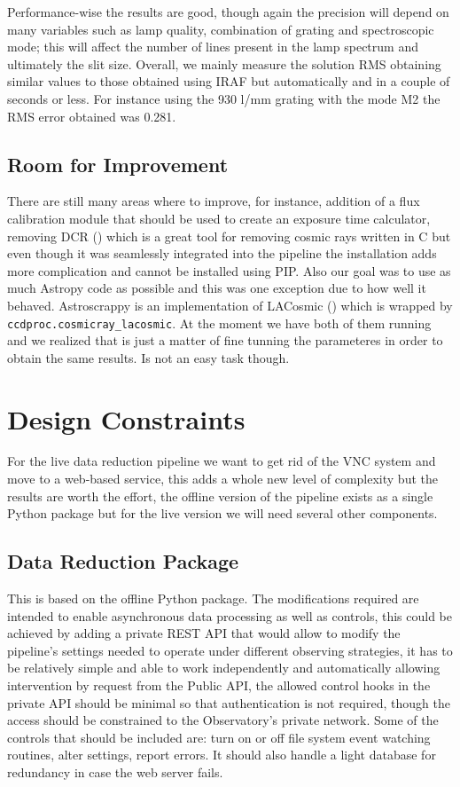 \documentclass[11pt,twoside]{article}
\begin{document}
Performance-wise the results are good, though again the precision will depend on many variables such as lamp quality, combination of grating and spectroscopic mode; this will affect the number of lines present in the lamp spectrum and ultimately the slit size. Overall, we mainly measure the solution RMS obtaining similar values to those obtained  using IRAF but automatically and in a couple of seconds or less. For instance  using the 930 l/mm grating with the mode M2 the RMS error obtained was 0.281.

\subsection{Room for Improvement}

There are still many areas where to improve, for instance, addition of a flux calibration module that should be used to create an exposure time calculator, removing DCR (\citet{2004PASP..116..148P}) which is a great tool for removing cosmic rays written in C but even though it was seamlessly integrated into the pipeline the installation adds more complication and cannot be installed using PIP. Also our goal was to use as much Astropy code as possible and this was one exception due to how well it behaved. Astroscrappy is an implementation of LACosmic (\citet{2001PASP..113.1420V}) which is wrapped by \verb=ccdproc.cosmicray_lacosmic=. At the moment we have both of them running and we realized that is just a matter of fine tunning the parameteres in order to obtain the same results. Is not an easy task though. 

\section{Design Constraints}

For the live data reduction pipeline we want to get rid of the VNC system and move to a web-based service, this adds a whole new level of complexity but the results are worth the effort, the offline version of the pipeline exists as a single Python package but for the live version  we will need several other components.

\subsection{Data Reduction Package}

This is based on the offline Python package. The modifications required are intended to enable asynchronous data processing as well as controls, this could be achieved by adding a private REST API that would allow to modify the pipeline's settings needed to operate under different observing strategies, it has to be relatively simple and able to work independently and automatically allowing intervention by request from the Public API, the allowed control hooks in the private API should be minimal so that authentication is not required, though the access should be constrained to the Observatory's private network. Some of the controls that should be included are: turn on or off file system event watching routines, alter settings, report errors. It should also handle a light database for redundancy in case the web server fails.
\end{document}
